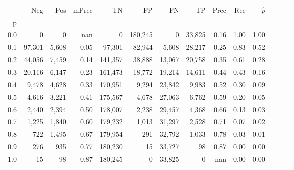\begin{tabular}{rrrrrrrrrrrrrr}
\toprule
{} &     Neg &    Pos & mPrec &       TN &       FP &      FN &      TP &  Prec &   Rec & $\hat{p}$ \\
p   &         &        &       &          &          &         &         &       &       &           \\
\midrule
0.0 &       0 &      0 &   nan &        0 &  180,245 &       0 &  33,825 &  0.16 &  1.00 &      1.00 \\
0.1 &  97,301 &  5,608 &  0.05 &   97,301 &   82,944 &   5,608 &  28,217 &  0.25 &  0.83 &      0.52 \\
0.2 &  44,056 &  7,459 &  0.14 &  141,357 &   38,888 &  13,067 &  20,758 &  0.35 &  0.61 &      0.28 \\
0.3 &  20,116 &  6,147 &  0.23 &  161,473 &   18,772 &  19,214 &  14,611 &  0.44 &  0.43 &      0.16 \\
0.4 &   9,478 &  4,628 &  0.33 &  170,951 &    9,294 &  23,842 &   9,983 &  0.52 &  0.30 &      0.09 \\
0.5 &   4,616 &  3,221 &  0.41 &  175,567 &    4,678 &  27,063 &   6,762 &  0.59 &  0.20 &      0.05 \\
0.6 &   2,440 &  2,394 &  0.50 &  178,007 &    2,238 &  29,457 &   4,368 &  0.66 &  0.13 &      0.03 \\
0.7 &   1,225 &  1,840 &  0.60 &  179,232 &    1,013 &  31,297 &   2,528 &  0.71 &  0.07 &      0.02 \\
0.8 &     722 &  1,495 &  0.67 &  179,954 &      291 &  32,792 &   1,033 &  0.78 &  0.03 &      0.01 \\
0.9 &     276 &    935 &  0.77 &  180,230 &       15 &  33,727 &      98 &  0.87 &  0.00 &      0.00 \\
1.0 &      15 &     98 &  0.87 &  180,245 &        0 &  33,825 &       0 &   nan &  0.00 &      0.00 \\
\bottomrule
\end{tabular}
